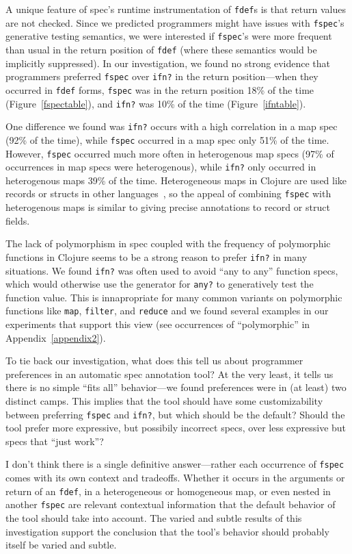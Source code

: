 A unique feature of spec's runtime instrumentation of \texttt{fdef}s is that
return values are not checked. Since we predicted programmers might have
issues with \texttt{fspec}'s generative testing semantics, we were interested
if \texttt{fspec}'s were more frequent than usual in the return position
of \texttt{fdef} (where these semantics would be implicitly suppressed).
In our investigation, we found no strong evidence that programmers preferred
\texttt{fspec} over \texttt{ifn?} in the return position---when they occurred in \texttt{fdef} forms,
\texttt{fspec} was in the return position 18\% of the time (Figure~\ref{fspectable}),
and \texttt{ifn?} was 10\% of the time (Figure~\ref{ifntable}).

One difference we found was \texttt{ifn?} occurs with a high correlation in
a map spec (92\% of the time), while \texttt{fspec} occurred in a map spec
only 51\% of the time.
However, \texttt{fspec} occurred much more often in heterogenous map specs
(97\% of occurrences in map specs were heterogenous), while \texttt{ifn?}
only occurred in heterogenous maps 39\% of the time.
Heterogeneous maps in Clojure are used like records or structs in other
languages~\cite{bonnaire2016practical}, so the appeal of combining
\texttt{fspec} with heterogenous maps is similar to giving precise annotations
to record or struct fields.

The lack of polymorphism in spec coupled with the frequency of polymorphic functions
in Clojure seems to be a strong reason to prefer \texttt{ifn?} in many situations.
We found \texttt{ifn?} was often used to avoid ``any to any'' function
specs, which would otherwise use the generator for \texttt{any?} to generatively test
the function value. This is innapropriate for many common variants on polymorphic functions like
\texttt{map}, \texttt{filter}, and \texttt{reduce}
and we found several examples in our experiments that support this view
(see occurrences of ``polymorphic'' in Appendix~\ref{appendix2}).


To tie back our investigation, what does this tell us about programmer preferences in an automatic spec annotation
tool? At the very least, it tells us there is no simple ``fits all'' behavior---we found
preferences were in (at least) two distinct camps.
This implies that the tool should have some customizability between preferring
\texttt{fspec} and \texttt{ifn?}, but which should be the default?
Should the tool prefer more expressive, but possibily incorrect specs, over less
expressive but specs that ``just work''?

I don't think there is a single definitive answer---rather each occurrence of \texttt{fspec}
comes with its own context and tradeoffs. Whether it occurs in the arguments or return of
an \texttt{fdef}, in a heterogeneous or homogeneous map, or even nested in another \texttt{fspec}
are relevant contextual information that the default behavior of the tool should take
into account. The varied and subtle results of this investigation support the conclusion
that the tool's behavior should probably itself be varied and subtle.
